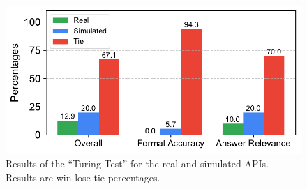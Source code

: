 
\begin{figure}[t!]
    \centering
    \includegraphics[width=\linewidth]{figs/turing_test.pdf}
    \caption{Results of the ``Turing Test'' for the real and simulated APIs. Results are win-lose-tie percentages.}
    \label{fig:turing_test}
\end{figure}



